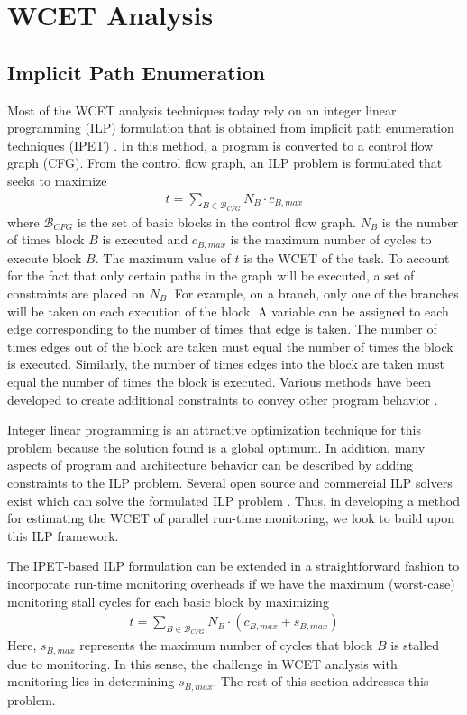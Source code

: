 \section{WCET Analysis}
\label{sec:monitoring_wcet.wcet}

\subsection{Implicit Path Enumeration}
\label{sec:monitoring_wcet.wcet.ipet}

Most of the WCET analysis techniques today rely on an integer linear
programming (ILP) formulation that is
obtained from implicit path enumeration techniques (IPET) \cite{li-ipet-dac95}.  In
this method, a program is converted to a control flow graph (CFG). From the
control flow graph, an ILP problem is formulated that seeks to maximize
\begin{align*}
  t = \sum_{B \in \mathcal{B}_{CFG}}{N_B \cdot c_{B,max}}
\end{align*} 
where $\mathcal{B}_{CFG}$ is the set of basic blocks in the control flow graph.
$N_{B}$ is the number of times block $B$ is executed and $c_{B,max}$ is the
maximum number of cycles to execute block $B$. The maximum value of $t$ is the
WCET of the task.  To account for the fact that only certain paths in the graph
will be executed, a set of constraints are placed on $N_{B}$. For example, on a
branch, only one of the branches will be taken on each execution of the block.
A variable can be assigned to each edge corresponding to the number of times
that edge is taken.  The number of times edges out of the block are taken must
equal the number of times the block is executed.  Similarly, the number of
times edges into the block are taken must equal the number of times the block
is executed. Various methods have been developed to create additional
constraints to convey other program behavior \cite{li-ipet-dac95,
wcetsurvey-tecs08}.

Integer linear programming is an attractive optimization technique for this
problem because the solution found is a global optimum. In addition, many
aspects of program and architecture behavior can be described by adding
constraints to the ILP problem.  Several open source and commercial ILP solvers
exist which can solve the formulated ILP problem \cite{lpsolve, cplex}.  Thus,
in developing a method for estimating the WCET of parallel run-time monitoring,
we look to build upon this ILP framework.

The IPET-based ILP formulation can be extended in a straightforward fashion to
incorporate run-time monitoring overheads if we have the maximum (worst-case)
monitoring stall cycles for each basic block by maximizing
\begin{align*}
  t = \sum_{B \in \mathcal{B}_{CFG}}{N_{B} \cdot (c_{B,max} + s_{B,max})}
\end{align*}
Here, $s_{B,max}$ represents the maximum number of cycles that block $B$ is
stalled due to monitoring. In this sense, the challenge in WCET analysis with
monitoring lies in determining $s_{B,max}$.  The rest of this section addresses
this problem.

